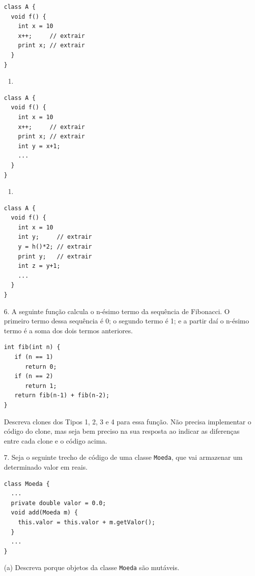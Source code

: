 \documentclass[
  11pt,
  twoside]{book}
\newcommand{\passthrough}[1]{#1}
\providecommand{\tightlist}{%
  \setlength{\itemsep}{0pt}\setlength{\parskip}{0pt}}
\begin{document}
\begin{lstlisting}
class A {
  void f() {
    int x = 10
    x++;     // extrair
    print x; // extrair
  }
}
\end{lstlisting}

\begin{enumerate}
\def\labelenumi{(\alph{enumi})}
\setcounter{enumi}{2}
\tightlist
\item
\end{enumerate}

\begin{lstlisting}
class A {
  void f() {
    int x = 10
    x++;     // extrair
    print x; // extrair
    int y = x+1;
    ...
  }
}
\end{lstlisting}

\begin{enumerate}
\def\labelenumi{(\alph{enumi})}
\setcounter{enumi}{3}
\tightlist
\item
\end{enumerate}

\begin{lstlisting}
class A {
  void f() {
    int x = 10
    int y;     // extrair
    y = h()*2; // extrair
    print y;   // extrair
    int z = y+1;
    ...
  }
}
\end{lstlisting}

6. A seguinte função calcula o n-ésimo termo da sequência de Fibonacci.
O primeiro termo dessa sequência é 0; o segundo termo é 1; e a partir
daí o n-ésimo termo é a soma dos dois termos anteriores.

\begin{lstlisting}
int fib(int n) {
   if (n == 1)
      return 0;
   if (n == 2)
      return 1;
   return fib(n-1) + fib(n-2);
}
\end{lstlisting}

Descreva clones dos Tipos 1, 2, 3 e 4 para essa função. Não precisa
implementar o código do clone, mas seja bem preciso na sua resposta ao
indicar as diferenças entre cada clone e o código acima.

7. Seja o seguinte trecho de código de uma classe
\passthrough{\lstinline!Moeda!}, que vai armazenar um determinado valor
em reais.

\begin{lstlisting}
class Moeda {
  ...
  private double valor = 0.0;
  void add(Moeda m) {
    this.valor = this.valor + m.getValor();
  } 
  ...
}
\end{lstlisting}

(a) Descreva porque objetos da classe \passthrough{\lstinline!Moeda!}
são mutáveis.
\end{document}
